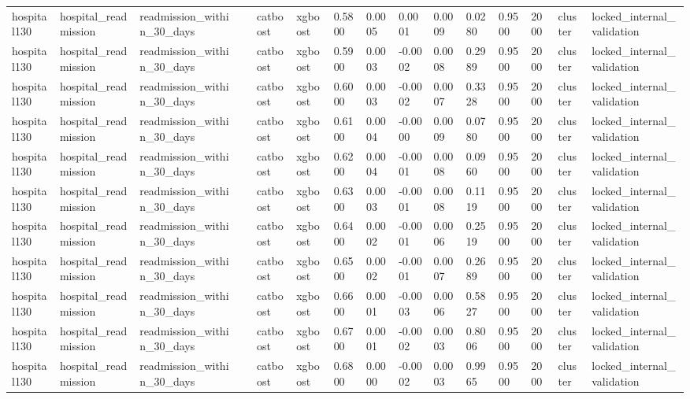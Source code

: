 \begin{tabular}{lllllllllllllll}
hospital130 & hospital\_readmission & readmission\_within\_30\_days &  & catboost & xgboost & 0.5800 & 0.0005 & 0.0001 & 0.0009 & 0.0280 & 0.9500 & 2000 & cluster & locked\_internal\_validation \\
hospital130 & hospital\_readmission & readmission\_within\_30\_days &  & catboost & xgboost & 0.5900 & 0.0003 & -0.0002 & 0.0008 & 0.2989 & 0.9500 & 2000 & cluster & locked\_internal\_validation \\
hospital130 & hospital\_readmission & readmission\_within\_30\_days &  & catboost & xgboost & 0.6000 & 0.0003 & -0.0002 & 0.0007 & 0.3328 & 0.9500 & 2000 & cluster & locked\_internal\_validation \\
hospital130 & hospital\_readmission & readmission\_within\_30\_days &  & catboost & xgboost & 0.6100 & 0.0004 & -0.0000 & 0.0009 & 0.0780 & 0.9500 & 2000 & cluster & locked\_internal\_validation \\
hospital130 & hospital\_readmission & readmission\_within\_30\_days &  & catboost & xgboost & 0.6200 & 0.0004 & -0.0001 & 0.0008 & 0.0960 & 0.9500 & 2000 & cluster & locked\_internal\_validation \\
hospital130 & hospital\_readmission & readmission\_within\_30\_days &  & catboost & xgboost & 0.6300 & 0.0003 & -0.0001 & 0.0008 & 0.1119 & 0.9500 & 2000 & cluster & locked\_internal\_validation \\
hospital130 & hospital\_readmission & readmission\_within\_30\_days &  & catboost & xgboost & 0.6400 & 0.0002 & -0.0001 & 0.0006 & 0.2519 & 0.9500 & 2000 & cluster & locked\_internal\_validation \\
hospital130 & hospital\_readmission & readmission\_within\_30\_days &  & catboost & xgboost & 0.6500 & 0.0002 & -0.0001 & 0.0007 & 0.2689 & 0.9500 & 2000 & cluster & locked\_internal\_validation \\
hospital130 & hospital\_readmission & readmission\_within\_30\_days &  & catboost & xgboost & 0.6600 & 0.0001 & -0.0003 & 0.0006 & 0.5827 & 0.9500 & 2000 & cluster & locked\_internal\_validation \\
hospital130 & hospital\_readmission & readmission\_within\_30\_days &  & catboost & xgboost & 0.6700 & 0.0001 & -0.0002 & 0.0003 & 0.8006 & 0.9500 & 2000 & cluster & locked\_internal\_validation \\
hospital130 & hospital\_readmission & readmission\_within\_30\_days &  & catboost & xgboost & 0.6800 & 0.0000 & -0.0002 & 0.0003 & 0.9965 & 0.9500 & 2000 & cluster & locked\_internal\_validation \\

\end{tabular}
